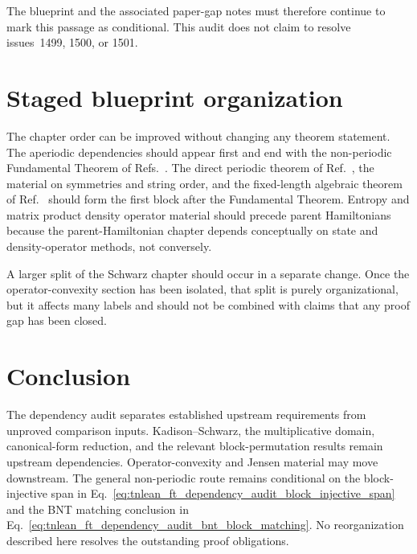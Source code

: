 \documentclass{article}
\begin{document}
The blueprint and the associated paper-gap notes must therefore continue to
mark this passage as conditional. This audit does not claim to resolve
issues~1499, 1500, or 1501.

\section{Staged blueprint organization}

The chapter order can be improved without changing any theorem statement. The
aperiodic dependencies should appear first and end with the non-periodic
Fundamental Theorem of
Refs.~\cite{Cirac2016MPDO_arXiv,Cirac2021Matrix}. The direct periodic theorem
of Ref.~\cite{DeLasCuevas2017Irreducible}, the material on symmetries and
string order, and the fixed-length algebraic theorem of
Ref.~\cite{Molnar2018NormalPEPS} should form the first block after the
Fundamental Theorem. Entropy and matrix product density operator material
should precede parent Hamiltonians because the parent-Hamiltonian chapter
depends conceptually on state and density-operator methods, not conversely.

A larger split of the Schwarz chapter should occur in a separate change. Once
the operator-convexity section has been isolated, that split is purely
organizational, but it affects many labels and should not be combined with
claims that any proof gap has been closed.

\section{Conclusion}

The dependency audit separates established upstream requirements from
unproved comparison inputs. Kadison--Schwarz, the multiplicative domain,
canonical-form reduction, and the relevant block-permutation results remain
upstream dependencies. Operator-convexity and Jensen material may move
downstream. The general non-periodic route remains conditional on the
block-injective span in
Eq.~\ref{eq:tnlean_ft_dependency_audit_block_injective_span} and the BNT
matching conclusion in
Eq.~\ref{eq:tnlean_ft_dependency_audit_bnt_block_matching}. No reorganization
described here resolves the outstanding proof obligations.



\end{document}
